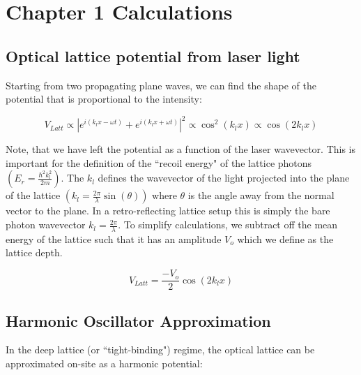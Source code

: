 
%


\chapter{Chapter 1 Calculations}
\label{appendix:Ch1Cal}

\newpage{}

\section{Optical lattice potential from laser light}

Starting from two propagating plane waves, we can find the shape of the potential that is proportional to the intensity:

\begin{equation}
V_{Latt} \propto |e^{i (k_l x - \omega t) } + e^{i (k_l x + \omega t)}|^2 \propto  \cos^2{\left ( k_l x \right ) } \propto \cos{\left ( 2 k_l x \right ) }
\end{equation}

Note, that we have left the potential as a function of the laser wavevector. This is important for the definition of the ``recoil energy" of the lattice photons $\left ( E_r = \frac{\hbar^2 k_l^2}{2 m} \right )$. The $k_l$ defines the wavevector of the light projected into the plane of the lattice $(k_l = \frac{2 \pi}{\lambda} \sin(\theta) )$ where $\theta$ is the angle away from the normal vector to the plane. In a retro-reflecting lattice setup this is simply the bare photon wavevector $k_l=\frac{2\pi}{\lambda}$. To simplify calculations, we subtract off the mean energy of the lattice such that it has an amplitude $V_o$ which we define as the lattice depth.

\begin{equation}
V_{Latt} = \frac{-V_o}{2} \cos{\left ( 2 k_l x \right ) } 
\end{equation}

\section{Harmonic Oscillator Approximation}

In the deep lattice (or ``tight-binding") regime, the optical lattice can be approximated on-site as a harmonic potential:

